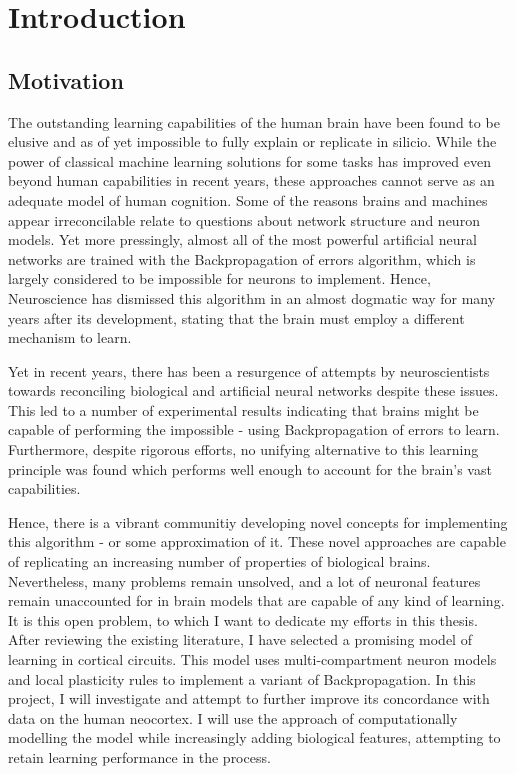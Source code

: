 
\chapter{Introduction}



\section{Motivation}

The outstanding learning capabilities of the human brain have been found to be elusive and as of yet impossible to fully
explain or replicate in silicio. While the power of classical machine learning solutions for some tasks has improved
even beyond human capabilities in recent years, these approaches cannot serve as an adequate model of human cognition.
Some of the reasons brains and machines appear irreconcilable relate to questions about network structure and neuron
models. Yet more pressingly, almost all of the most powerful artificial neural networks are trained with the
Backpropagation of errors algorithm, which is largely considered to be impossible for neurons to implement. Hence,
Neuroscience has dismissed this algorithm in an almost dogmatic way for many years after its development, stating that
the brain must employ a different mechanism to learn.

Yet in recent years, there has been a resurgence of attempts by neuroscientists towards reconciling biological and
artificial neural networks despite these issues. This led to a number of experimental results indicating that
brains might be capable of performing the impossible - using Backpropagation of errors to learn. Furthermore, despite
rigorous efforts, no unifying alternative to this learning principle was found which performs well enough to account
for the brain's vast capabilities.

Hence, there is a vibrant communitiy developing  novel concepts for implementing this algorithm - or some approximation
of it. These novel approaches are capable of replicating an increasing number of properties of biological brains.
Nevertheless, many problems remain unsolved, and a lot of neuronal features remain unaccounted for in brain models that
are capable of any kind of learning. It is this open problem, to which I want to dedicate my efforts in this thesis.
After reviewing the existing literature, I have selected a promising model of learning in cortical circuits. This model
uses multi-compartment neuron models and local plasticity rules to implement a variant of Backpropagation. In this
project, I will investigate and attempt to further improve its concordance with data on the human neocortex. I will use
the approach of computationally modelling the model while increasingly adding biological features, attempting to retain
learning performance in the process.


